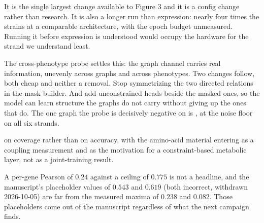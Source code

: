  It is the single largest change
available to Figure 3 and it is a config change rather than research. It is also a longer
run than expression: nearly four times the strains at a comparable architecture, with the
epoch budget unmeasured. Running it before expression is understood would occupy the
hardware for the strand we understand least.

 The cross-phenotype probe
settles this: the graph channel carries real information, unevenly across graphs and across
phenotypes. Two changes follow, both cheap and neither a removal. Stop symmetrizing the two
directed relations in the mask builder. And add unconstrained heads beside the masked ones,
so the model can learn structure the graphs do not carry without giving up the ones that do.
The one graph the probe is decisively negative on is , at the noise floor on all
six strands.

 on coverage rather than on accuracy, with the
amino-acid material entering as a coupling measurement and as the motivation for a
constraint-based metabolic layer, not as a joint-training result.

 A per-gene Pearson of $0.24$ against a ceiling of $0.775$ is
not a headline, and the manuscript's placeholder values of $0.543$ and $0.619$ (both incorrect, withdrawn 2026-10-05) are far from
the measured maxima of $0.238$ and $0.082$. Those placeholders come out of the manuscript regardless
of what the next campaign finds.

